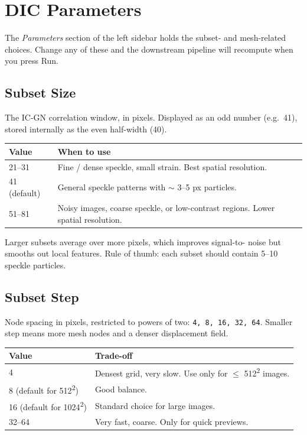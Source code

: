 \section{DIC Parameters}
\label{sec:parameters}

The \emph{Parameters} section of the left sidebar holds the subset-
and mesh-related choices. Change any of these and the downstream
pipeline will recompute when you press Run.

\subsection{Subset Size}

The IC-GN correlation window, in pixels. Displayed as an odd number
(e.g.\ 41), stored internally as the even half-width (40).

\begin{center}
\begin{tabular}{lp{8cm}}
  \toprule
  Value & When to use \\
  \midrule
  21--31 & Fine / dense speckle, small strain. Best spatial resolution. \\
  41 (default) & General speckle patterns with $\sim$ 3--5 px particles. \\
  51--81 & Noisy images, coarse speckle, or low-contrast regions. Lower spatial resolution. \\
  \bottomrule
\end{tabular}
\end{center}

Larger subsets average over more pixels, which improves signal-to-
noise but smooths out local features. Rule of thumb: each subset
should contain 5--10 speckle particles.

\subsection{Subset Step}

Node spacing in pixels, restricted to powers of two:
\texttt{4, 8, 16, 32, 64}. Smaller step means more mesh nodes and a
denser displacement field.

\begin{center}
\begin{tabular}{lp{8cm}}
  \toprule
  Value & Trade-off \\
  \midrule
  4 & Densest grid, very slow. Use only for $\leq$ 512\textsuperscript{2} images. \\
  8 (default for 512\textsuperscript{2}) & Good balance. \\
  16 (default for 1024\textsuperscript{2}) & Standard choice for large images. \\
  32--64 & Very fast, coarse. Only for quick previews. \\
  \bottomrule
\end{tabular}
\end{center}

